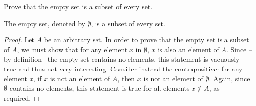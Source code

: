 \begin{exercise}
	Prove that the empty set is a subset of every set.
\end{exercise}
\begin{proposition}
	The empty set, denoted by $\emptyset$, is a subset of every set.
\end{proposition}
\begin{proof}
	Let $A$ be an arbitrary set. In order to prove that the empty set is a subset of $A$, we must show that for any element $x$ in $\emptyset$, $x$ is also an element of $A$. Since --by definition-- the empty set contains no elements, this statement is vacuously true and thus not very interesting.
	\newline\newline
	Consider instead the contrapositive: for any element $x$, if $x$ is not an element of $A$, then $x$ is not an element of $\emptyset$. Again, since $\emptyset$ contains no elements, this statement is true for all elements $x \notin A$, as required.
\end{proof}
